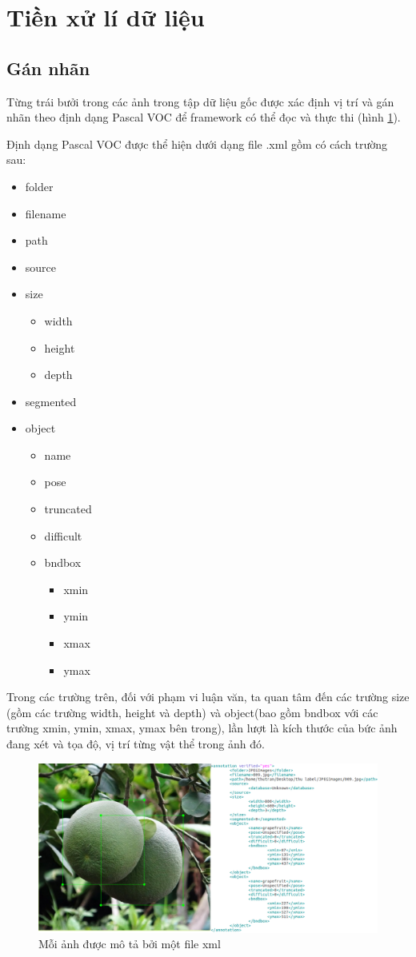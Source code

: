 \section{Tiền xử lí dữ liệu}
\subsection{Gán nhãn}
Từng trái bưởi trong các ảnh trong tập dữ liệu gốc được xác định vị trí và gán nhãn theo định dạng Pascal VOC để framework có thể đọc và thực thi (hình \ref{chap3:voc_format}).

Định dạng Pascal VOC được thể hiện dưới dạng file .xml gồm có cách trường sau:
\begin{itemize}
	\item folder
	\item filename
	\item path
	\item source
	\item size
	\begin{itemize}
		\item width
		\item height
		\item depth
	\end{itemize}
	\item segmented
	\item object
	\begin{itemize}
		\item name
		\item pose
		\item truncated 
		\item difficult
		\item bndbox
		\begin{itemize}
			\item xmin
			\item ymin
			\item xmax
			\item ymax
		\end{itemize}
	\end{itemize}
\end{itemize} 
Trong các trường trên, đối với phạm vi luận văn, ta quan tâm đến các trường size (gồm các trường width, height và depth) và object(bao gồm bndbox với các trường xmin, ymin, xmax, ymax bên trong), lần lượt là kích thước của bức ảnh đang xét và tọa độ, vị trí từng vật thể trong ảnh đó.
	\begin{center}
    	\begin{figure}[H]
    	\centering
    	\includegraphics[width=0.7\columnwidth]{images/chap3/label.png}
    	\caption{Mỗi ảnh được mô tả bởi một file xml}
    	\label{chap3:voc_format}
    	\end{figure}
	\end{center}
